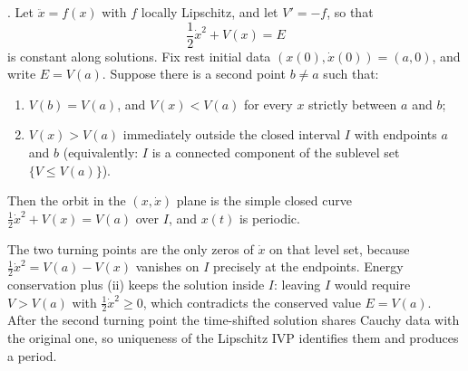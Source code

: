 \documentclass[11pt,a4paper]{article}
\begin{document}
\begin{proposition}
\label{prop:energy-periodic}
\cite{grade2period}. Let \(\ddot x=f(x)\) with \(f\) locally Lipschitz, and let \(V'=-f\), so that
\[
\frac12\dot x^{2}+V(x)=E
\]
is constant along solutions. Fix rest initial data \((x(0),\dot x(0))=(a,0)\), and write \(E=V(a)\). Suppose there is a second point \(b\neq a\) such that:
\begin{enumerate}[label=\textup{(\roman*)}]
    \item \(V(b)=V(a)\), and \(V(x)<V(a)\) for every \(x\) strictly between \(a\) and \(b\);
    \item \(V(x)>V(a)\) immediately outside the closed interval \(I\) with endpoints \(a\) and \(b\) (equivalently: \(I\) is a connected component of the sublevel set \(\{V\le V(a)\}\)).
\end{enumerate}
Then the orbit in the \((x,\dot x)\) plane is the simple closed curve \(\frac12\dot x^{2}+V(x)=V(a)\) over \(I\), and \(x(t)\) is periodic.

The two turning points are the only zeros of \(\dot x\) on that level set, because \(\frac12\dot x^{2}=V(a)-V(x)\) vanishes on \(I\) precisely at the endpoints. Energy conservation plus (ii) keeps the solution inside \(I\): leaving \(I\) would require \(V>V(a)\) with \(\frac12\dot x^{2}\ge 0\), which contradicts the conserved value \(E=V(a)\). After the second turning point the time-shifted solution shares Cauchy data with the original one, so uniqueness of the Lipschitz IVP identifies them and produces a period.
\end{proposition}
\end{document}
